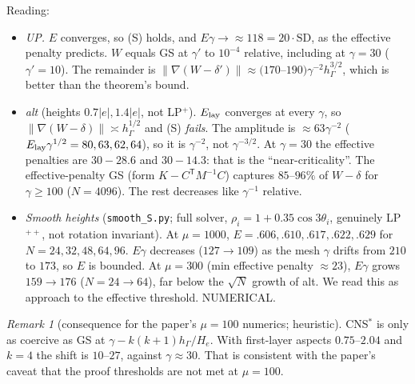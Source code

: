 \documentclass[11pt]{article}
\theoremstyle{remark}
\newtheorem{remark}[theorem]{Remark}
\newcommand{\hG}{h_\Gamma}
\begin{document}
\smallskip\noindent Reading:
\begin{itemize}
\item \emph{\textsf{UP}.} $E$ converges, so (S) holds, and $E\gamma\to\approx118=20\cdot\mathrm{SD}$, as the effective penalty predicts.
 $W$ equals GS at $\gamma'$ to $10^{-4}$ relative, including at $\gamma=30$ ($\gamma'=10$). The remainder is $\|\nabla(W-\delta')\|\approx(170$--$190)\gamma^{-2}\hG^{3/2}$, which is better than the theorem's bound.
\item \emph{alt} (heights $0.7|e|,1.4|e|$, not LP$^+$). $E_{\rm lay}$ converges at every $\gamma$, so $\|\nabla(W-\delta)\|\asymp\hG^{1/2}$ and (S) \emph{fails}.
 The amplitude is $\approx63\gamma^{-2}$ ($E_{\rm lay}\gamma^{1/2}=80,63,62,64$), so it is $\gamma^{-2}$, not $\gamma^{-3/2}$.
 At $\gamma=30$ the effective penalties are $30-28.6$ and $30-14.3$: that is the ``near-criticality''.
 The effective-penalty GS (form $K-C^{\mathsf T}M^{-1}C$) captures $85$--$96\%$ of $W-\delta$ for $\gamma\ge100$ ($N=4096$). The rest decreases like $\gamma^{-1}$ relative.
\item \emph{Smooth heights} (\texttt{smooth\_S.py}; full solver, $\rho_i=1+0.35\cos3\theta_i$, genuinely LP$^{++}$, not rotation invariant).
 At $\mu=1000$, $E=.606,.610,.617,.622,.629$ for $N=24,32,48,64,96$. $E\gamma$ decreases ($127\to109$) as the mesh $\gamma$ drifts from $210$ to $173$, so $E$ is bounded.
 At $\mu=300$ (min effective penalty $\approx23$), $E\gamma$ grows $159\to176$ ($N=24\to64$), far below the $\sqrt{N}$ growth of alt. We read this as approach to the effective threshold. NUMERICAL.
\end{itemize}

\begin{remark}[consequence for the paper's $\mu=100$ numerics; heuristic]
CNS$^\ast$ is only as coercive as GS at $\gamma-k(k+1)\hG/H_e$. With first-layer aspects $0.75$--$2.04$ and $k=4$ the shift is $10$--$27$, against
$\gamma\approx30$. That is consistent with the paper's caveat that the proof thresholds are not met at $\mu=100$.
\end{remark}
\end{document}
